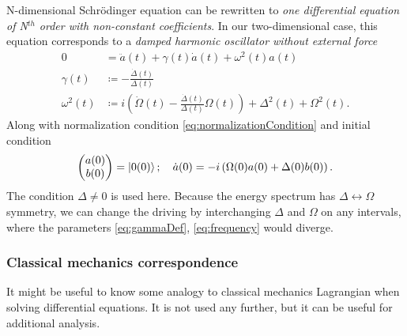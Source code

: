 N-dimensional Schr\"odinger equation can be rewritten to \emph{one differential equation of N$^{th}$ order with non-constant coefficients}. In our two-dimensional case, this equation corresponds to a \emph{damped harmonic oscillator without external force}
\begin{align}
    0&= \ddot a(t)+ \gamma(t) \dot a(t)+\omega^2(t)a(t) \label{eq:harmonicOscillator}\\
    \gamma(t)&\coloneqq -\frac{\dot \Delta(t)}{\Delta(t)} \label{eq:gammaDef}\\
    \omega^2(t) &\coloneqq i\left(\dot \Omega(t)-\frac{\dot\Delta(t)}{\Delta(t)}\Omega(t)\right)+\Delta^2(t)+\Omega^2(t).
    \label{eq:frequency}
\end{align}
Along with normalization condition \ref{eq:normalizationCondition} and initial condition
\begin{equation}
    \begin{pmatrix}
        a(0)\\b(0)
    \end{pmatrix}=\ket{0(0)}; \quad \dot a(0)=-i\left(\Omega(0) a(0)+\Delta(0)b(0)\right).
\end{equation}
The condition $\Delta\neq 0$ is used here. Because the energy spectrum has $\Delta\leftrightarrow \Omega$ symmetry, we can change the driving by interchanging $\Delta$ and $\Omega$ on any intervals, where the parameters \ref{eq:gammaDef}, \ref{eq:frequency} would diverge.


\subsubsection{Classical mechanics correspondence}
It might be useful to know some analogy to classical mechanics Lagrangian when solving differential equations. It is not used any further, but it can be useful for additional analysis.

